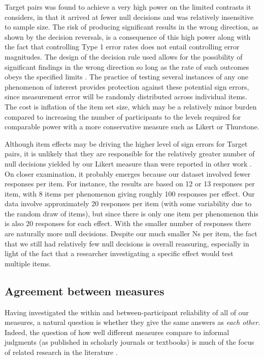 \documentclass[doc]{apa6}
\newcommand{\targchoice}{{\sc Target pairs}}
\newcommand{\thurstone}{{\sc Thurstone}}
\newcommand{\likert}{{\sc Likert}}
\begin{document}
\targchoice{} was found to achieve a very high power on the limited contrasts it considers, in that it arrived at fewer null decisions and was relatively insensitive to sample size. The risk of producing significant results in the wrong direction, as shown by the decision reversals, is a consequence of this high power along with the fact that controlling Type 1 error rates does not entail controlling error magnitudes. The design of the decision rule used allows for the possibility of significant findings in the wrong direction so long as the rate of such outcomes obeys the specified limits \citep{cumming2006CIcapture, gelman2000typeSerror}.
The practice of testing several instances of any one phenomenon of interest \citep{schutze2011linguisticevidence} provides protection against these potential sign errors, since measurement error will be randomly distributed across individual items. The cost is inflation of the item set size, which may be a relatively minor burden compared to increasing the number of participants to the levels required for comparable power with a more conservative measure such as \likert{} or \thurstone.

Although item effects may be driving the higher level of sign errors for \targchoice{}, it is unlikely that they are responsible for the relatively greater number of null decisions yielded by our \likert{} measure than were reported in other work
\citep{sprouse2013formalinformal,mahowald2016snapjudgments,haussler2016replicationposter}. On closer examination, it probably emerges because our dataset involved fewer responses per item. For instance, the \citet{sprouse2013formalinformal} results are based on 12 or 13 responses per item, with 8 items per phenomenon giving roughly 100 responses per effect. Our data involve approximately 20 responses per item (with some variability due to the random draw of items), but since there is only one item per phenomenon this is also 20 responses for each effect. With the smaller number of responses there are naturally more null decisions. Despite our much smaller Ns per item, the fact that we still had relatively few null decisions is overall reassuring, especially in light of the fact that a researcher investigating a specific effect would test multiple items.

\subsection{Agreement between measures}

Having investigated the within and between-participant reliability of all of our measures, a natural question is whether they give the same answers as {\it each other}. Indeed, the question of how well different measures compare to informal judgments (as published in scholarly journals or textbooks) is much of the focus of related research in the literature \citep{sprouse2013formalinformal,gibson2013needforquantmethods,munro2010crowdsourcinglanguagestudies,myers2012testingislandconstraints,featherston2007datastickandcarrot,sprouse2012revisitingadgerscoresyntax}.
\end{document}
